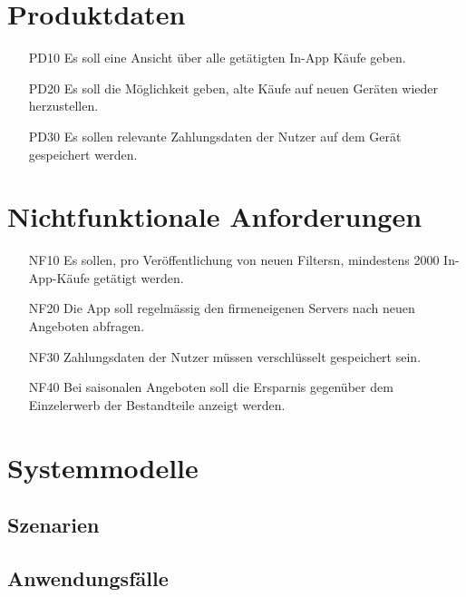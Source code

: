 \documentclass[parskip=full]{scrartcl}
\begin{document}
\section{Produktdaten}
\begin{itemize}[nosep]
\item[PD10] Es soll eine Ansicht \"uber alle get\"atigten In-App K\"aufe geben.
\item[PD20] Es soll die M\"oglichkeit geben, alte K\"aufe auf neuen Ger\"aten wieder herzustellen.
\item[PD30] Es sollen relevante Zahlungsdaten der Nutzer auf dem Ger\"at gespeichert werden.
\end{itemize}

\section{Nichtfunktionale Anforderungen}
\begin{itemize}[nosep]
\item[NF10] Es sollen, pro Ver\"offentlichung von neuen \glspl{Filter}n, mindestens 2000 In-App-K\"aufe get\"atigt werden.
\item[NF20] Die App soll regelm\"assig den firmeneigenen \glspl{Server} nach neuen Angeboten abfragen.
\item[NF30] Zahlungsdaten der Nutzer m\"ussen verschl\"usselt gespeichert sein.
\item[NF40] Bei saisonalen Angeboten soll die Ersparnis gegen\"uber dem Einzelerwerb der Bestandteile anzeigt werden.
\end{itemize}

\section{Systemmodelle}

\subsection{Szenarien}

\subsection{Anwendungsf\"alle}

\glsaddall
\printnoidxglossaries
\end{document}
